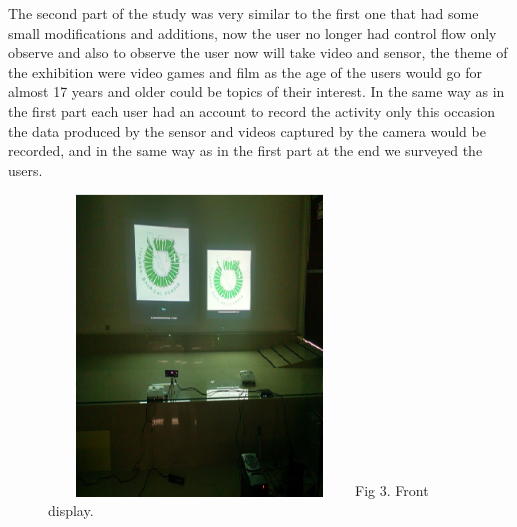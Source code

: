 \documentclass[journal]{IEEEtran}
\begin{document}

The second part of the study was very similar to the first one that had some small modifications and additions, now the user no longer had control flow only observe and also to observe the user now will take video and sensor, the theme of the exhibition were video games and film as the age of the users would go for almost 17 years and older could be topics of their interest. In the same way as in the first part each user had an account to record the activity only this occasion the data produced by the sensor and videos captured by the camera would be recorded, and in the same way as in the first part at the end we surveyed the users.
     
\begin{figure}[H]
	\centering
	\includegraphics[width=80mm,height=80mm]{frenteexhi.PNG}
	\label{fig:Figure 3}
	Fig 3. Front display.
\end{figure}


\end{document}
